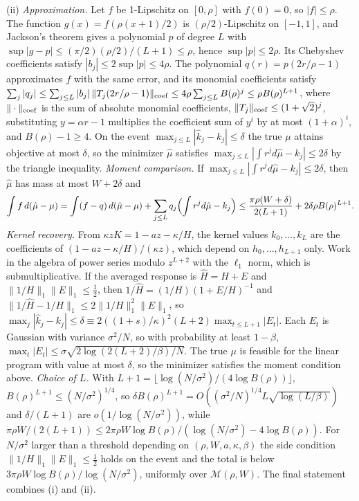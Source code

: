 \documentclass[12pt]{article}
\theoremstyle{definition}
\theoremstyle{remark}
\begin{document}
(ii) \emph{Approximation.} Let $f$ be 1-Lipschitz on $[0,\rho]$ with $f(0)=0$, so $|f|\le\rho$. The function $g(x)=f(\rho(x+1)/2)$ is $(\rho/2)$-Lipschitz on $[-1,1]$, and Jackson's theorem \citep{rivlin1981} gives a polynomial $p$ of degree $L$ with $\sup|g-p|\le(\pi/2)(\rho/2)/(L+1)\le\rho$, hence $\sup|p|\le2\rho$. Its Chebyshev coefficients satisfy $|b_j|\le2\sup|p|\le4\rho$. The polynomial $q(r)=p(2r/\rho-1)$ approximates $f$ with the same error, and its monomial coefficients satisfy $\sum_j|q_j|\le\sum_{j\le L}|b_j|\,\|T_j(2r/\rho-1)\|_{\rm coef}\le4\rho\sum_{j\le L}B(\rho)^j\le\rho B(\rho)^{L+1}$, where $\|\cdot\|_{\rm coef}$ is the sum of absolute monomial coefficients, $\|T_j\|_{\rm coef}\le(1+\sqrt2)^j$, substituting $y=\alpha r-1$ multiplies the coefficient sum of $y^i$ by at most $(1+\alpha)^i$, and $B(\rho)-1\ge4$. On the event $\max_{j\le L}|\hat k_j-k_j|\le\delta$ the true $\mu$ attains objective at most $\delta$, so the minimizer $\hat\mu$ satisfies $\max_{j\le L}|\int r^jd\hat\mu-k_j|\le2\delta$ by the triangle inequality. \emph{Moment comparison.} If $\max_{j\le L}|\int r^jd\hat\mu-k_j|\le2\delta$, then $\hat\mu$ has mass at most $W+2\delta$ and
\[
\int f\,d(\hat\mu-\mu)=\int(f-q)\,d(\hat\mu-\mu)+\sum_{j\le L}q_j\Bigl(\int r^jd\hat\mu-k_j\Bigr)\le\frac{\pi\rho(W+\delta)}{2(L+1)}+2\delta\rho B(\rho)^{L+1}.
\]
\emph{Kernel recovery.} From $\kappa zK=1-az-\kappa/H$, the kernel values $k_0,\ldots,k_L$ are the coefficients of $(1-az-\kappa/H)/(\kappa z)$, which depend on $h_0,\ldots,h_{L+1}$ only. Work in the algebra of power series modulo $z^{L+2}$ with the $\ell_1$ norm, which is submultiplicative. If the averaged response is $\hat H=H+E$ and $\|1/H\|_1\|E\|_1\le\tfrac12$, then $1/\hat H=(1/H)(1+E/H)^{-1}$ and $\|1/\hat H-1/H\|_1\le2\|1/H\|_1^2\|E\|_1$, so $\max_j|\hat k_j-k_j|\le\delta\equiv2((1+s)/\kappa)^2(L+2)\max_{t\le L+1}|E_t|$. Each $E_t$ is Gaussian with variance $\sigma^2/N$, so with probability at least $1-\beta$, $\max_t|E_t|\le\sigma\sqrt{2\log(2(L+2)/\beta)/N}$. The true $\mu$ is feasible for the linear program with value at most $\delta$, so the minimizer satisfies the moment condition above. \emph{Choice of $L$.} With $L+1=\lfloor\log(N/\sigma^2)/(4\log B(\rho))\rfloor$, $B(\rho)^{L+1}\le(N/\sigma^2)^{1/4}$, so $\delta B(\rho)^{L+1}=O((\sigma^2/N)^{1/4}L\sqrt{\log(L/\beta)})$ and $\delta/(L+1)$ are $o(1/\log(N/\sigma^2))$, while $\pi\rho W/(2(L+1))\le2\pi\rho W\log B(\rho)/(\log(N/\sigma^2)-4\log B(\rho))$. For $N/\sigma^2$ larger than a threshold depending on $(\rho,W,a,\kappa,\beta)$ the side condition $\|1/H\|_1\|E\|_1\le\frac12$ holds on the event and the total is below $3\pi\rho W\log B(\rho)/\log(N/\sigma^2)$, uniformly over $\mathcal M(\rho,W)$. The final statement combines (i) and (ii).
\end{document}
